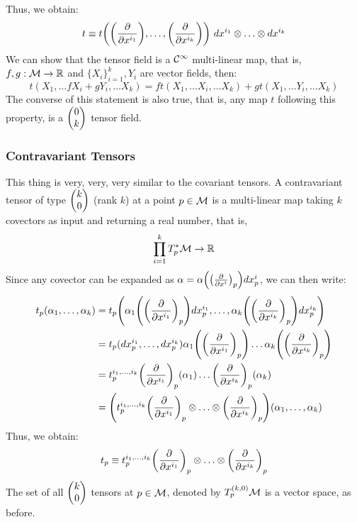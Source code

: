 Thus, we obtain: 
$$t \equiv t\qty(\qty(\pdv{x^{i_1}}), \ldots,\qty(\pdv{x^{i_k}})) \ dx^{i_1}\otimes \ldots \otimes dx^{i_k}$$
 We can show that the tensor field is a $\mathcal C^\infty$ multi-linear map, that is, $f,g: \mathcal M\rightarrow \mathbb{R}$ and $\{X_i\}_{i=1}^k, Y_i$ are vector fields, then:
 $$t(X_1,\ldots fX_i+gY_i, \ldots X_k) = ft(X_1,\ldots X_i, \ldots X_k) + gt(X_1,\ldots  Y_i, \ldots X_k)$$
 The converse of this statement is also true, that is, any map $t$ following this property, is a $\mqty(0\\k)$ tensor field. 


\subsubsection{Contravariant Tensors} 
This thing is very, very, very similar to the covariant tensors. A contravariant tensor of type $\mqty(k\\0)$ (rank $k$) at a point $p\in \mathcal M$ is a multi-linear map taking $k$ covectors as input and returning a real number, that is,
$$\prod_{i=1}^{k}T_p^*\mathcal M \rightarrow \mathbb{R}$$
Since any covector can be expanded as $\alpha = \alpha\qty(\qty(\pdv{x^i})_p)dx^i_p$, we can then write:
\begin{align*}
    t_p(\alpha_1,\ldots,\alpha_k) &= t_p\qty(\alpha_1\qty(\qty(\pdv{x^{i_1}})_p)dx^{i_1}_p,\ldots, \alpha_k\qty(\qty(\pdv{x^{i_k}})_p)dx^{i_k}_p)\\
    &=t_p(dx^{i_1}_p,\ldots, dx^{i_k}_p) \alpha_1\qty(\qty(\pdv{x^{i_1}})_p)\ldots \alpha_k\qty(\qty(\pdv{x^{i_k}})_p)\\
    &=t_p^{i_1,\ldots,i_k}\qty(\pdv{x^{i_1}})_p(\alpha_1)\ldots \qty(\pdv{x^{i_k}})_p(\alpha_k)\\
    &=\qty(t_p^{i_1,\ldots,i_k} \qty(\pdv{x^{i_1}})_p \otimes \ldots \otimes\qty(\pdv{x^{i_k}})_p)(\alpha_1,\ldots,\alpha_k)
\end{align*}
Thus, we obtain:
$$t_p \equiv t_p^{i_1,\ldots,i_k} \qty(\pdv{x^{i_1}})_p \otimes \ldots \otimes\qty(\pdv{x^{i_k}})_p$$
The set of all $\mqty(k\\0)$ tensors at $p\in \mathcal M$, denoted by $T_p^{(k,0)}\mathcal M$ is a vector space, as before.

